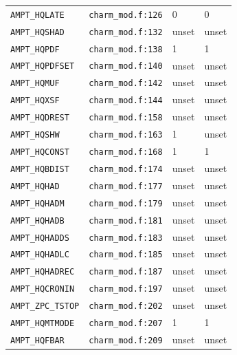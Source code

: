 {\begin{longtable}{@{}p{4.2cm}p{3.4cm}p{2.8cm}p{2.8cm}@{}}
\texttt{AMPT\_\allowbreak{}HQLATE} & \texttt{charm\_\allowbreak{}mod.f:126} & 0 & 0 \\
\texttt{AMPT\_\allowbreak{}HQSHAD} & \texttt{charm\_\allowbreak{}mod.f:132} & unset & unset \\
\texttt{AMPT\_\allowbreak{}HQPDF} & \texttt{charm\_\allowbreak{}mod.f:138} & 1 & 1 \\
\texttt{AMPT\_\allowbreak{}HQPDFSET} & \texttt{charm\_\allowbreak{}mod.f:140} & unset & unset \\
\texttt{AMPT\_\allowbreak{}HQMUF} & \texttt{charm\_\allowbreak{}mod.f:142} & unset & unset \\
\texttt{AMPT\_\allowbreak{}HQXSF} & \texttt{charm\_\allowbreak{}mod.f:144} & unset & unset \\
\texttt{AMPT\_\allowbreak{}HQDREST} & \texttt{charm\_\allowbreak{}mod.f:158} & unset & unset \\
\texttt{AMPT\_\allowbreak{}HQSHW} & \texttt{charm\_\allowbreak{}mod.f:163} & 1 & unset \\
\texttt{AMPT\_\allowbreak{}HQCONST} & \texttt{charm\_\allowbreak{}mod.f:168} & 1 & 1 \\
\texttt{AMPT\_\allowbreak{}HQBDIST} & \texttt{charm\_\allowbreak{}mod.f:174} & unset & unset \\
\texttt{AMPT\_\allowbreak{}HQHAD} & \texttt{charm\_\allowbreak{}mod.f:177} & unset & unset \\
\texttt{AMPT\_\allowbreak{}HQHADM} & \texttt{charm\_\allowbreak{}mod.f:179} & unset & unset \\
\texttt{AMPT\_\allowbreak{}HQHADB} & \texttt{charm\_\allowbreak{}mod.f:181} & unset & unset \\
\texttt{AMPT\_\allowbreak{}HQHADDS} & \texttt{charm\_\allowbreak{}mod.f:183} & unset & unset \\
\texttt{AMPT\_\allowbreak{}HQHADLC} & \texttt{charm\_\allowbreak{}mod.f:185} & unset & unset \\
\texttt{AMPT\_\allowbreak{}HQHADREC} & \texttt{charm\_\allowbreak{}mod.f:187} & unset & unset \\
\texttt{AMPT\_\allowbreak{}HQCRONIN} & \texttt{charm\_\allowbreak{}mod.f:197} & unset & unset \\
\texttt{AMPT\_\allowbreak{}ZPC\_\allowbreak{}TSTOP} & \texttt{charm\_\allowbreak{}mod.f:202} & unset & unset \\
\texttt{AMPT\_\allowbreak{}HQMTMODE} & \texttt{charm\_\allowbreak{}mod.f:207} & 1 & 1 \\
\texttt{AMPT\_\allowbreak{}HQFBAR} & \texttt{charm\_\allowbreak{}mod.f:209} & unset & unset \\

\end{longtable}}

